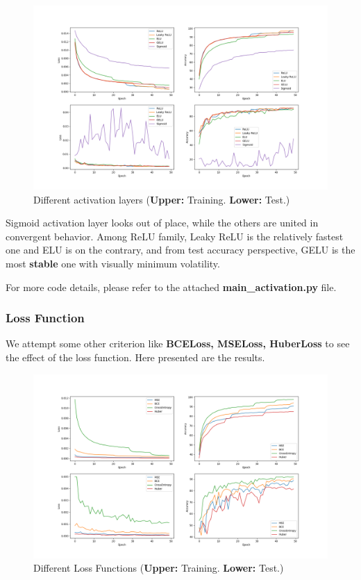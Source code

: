 \documentclass[a4paper, 11pt]{article} %
\begin{document}
\begin{figure}[H]
	\centering
	\includegraphics[width=1.0\textwidth]{./img/activation.png}
	\caption{Different activation layers (\textbf{Upper:} Training. \textbf{Lower:} Test.)}
\end{figure}

Sigmoid activation layer looks out of place, while the others are united in convergent
behavior. Among ReLU family, Leaky ReLU is the relatively fastest one and ELU is on the
contrary, and from test accuracy perspective, GELU is the most \textbf{stable} one with
visually minimum volatility.

For more code details, please refer to the attached \textbf{main\_activation.py} file.

\subsubsection{\textbf{Loss Function}}

We attempt some other criterion like \textbf{BCELoss, MSELoss, HuberLoss} to see the effect
of the loss function. Here presented are the results.

\begin{figure}[H]
	\centering
	\includegraphics[width=1.0\textwidth]{./img/criterion.png}
	\caption{Different Loss Functions (\textbf{Upper:} Training. \textbf{Lower:} Test.)}
\end{figure}
\end{document}
